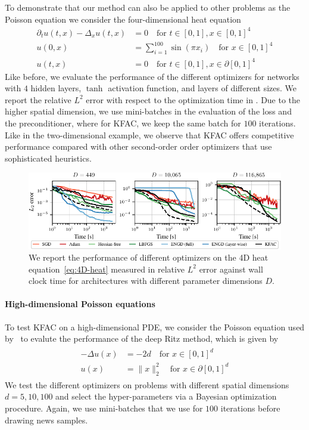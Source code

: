 To demonstrate that our method can also be applied to other problems as the Poisson equation we consider the four-dimensional heat equation
\begin{align}\label{eq:4D-heat}
     \partial_t u(t,x)-\Delta_x u(t,x) & = 0 \quad \text{for } t\in[0,1], x\in [0,1]^{4} \\
    u(0,x) & = \sum_{i=1}^{100} \sin(\pi x_i) \quad \text{for }
     x\in [0,1]^{4}
     \\
     u(t,x) & = 0 \quad \text{for } t\in[0,1], x\in\partial[0,1]^{4}
\end{align}
Like before, we evaluate the performance of the different optimizers for networks with $4$ hidden layers, $\tanh$ activation function, and layers of different sizes.
We report the relative $L^2$ error with respect to the optimization time in .
Due to the higher spatial dimension, we use mini-batches in the evaluation of the loss and the preconditioner, where for KFAC, we keep the same batch for $100$ iterations. 
Like in the two-dimensional example, we observe that KFAC offers competitive performance compared with other second-order order optimizers that use sophisticated heuristics. 
\begin{figure}
    \centering
    \includegraphics{../kfac_pinns_exp/exp30_heat4d_groupplot/l2_error_over_time.pdf}
    \caption{We report the performance of different optimizers on the 4D heat equation~\eqref{eq:4D-heat} measured in relative $L^2$ error against wall clock time for architectures with different parameter dimensions $D$.}
    \label{fig:4D-heat}
\end{figure}


\paragraph{High-dimensional Poisson equations}
To test KFAC on a high-dimensional PDE, we consider the Poisson equation used by~\cite{yu2018deep} to evalute the performance of the deep Ritz method, which is given by 
\begin{align}\label{eq:high_dimensional_poisson}
    \begin{split}
        -\Delta u(x) & = -2d \quad \text{for } x\in [0,1]^{d} \\
    u(x) & = \lVert x \rVert_2^2 \quad \text{for } x\in \partial[0,1]^{d}
    \end{split}
\end{align}
We test the different optimizers on problems with different spatial dimensions $d=5, 10, 100$ and select the hyper-parameters via a Bayesian optimization procedure. 
Again, we use mini-batches that we use for $100$ iterations before drawing news samples. 

